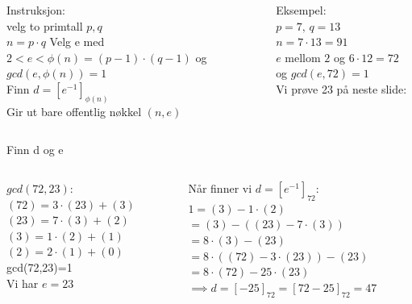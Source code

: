 \begin{frame}{}
    \begin{columns}
        \begin{column}{0.45 \textwidth}
            Instruksjon:\\
            velg to primtall $p,q$\\
            $n=p\cdot q$
            Velg e med $2<e<\phi(n)=(p-1)\cdot (q-1)$ og $gcd(e,\phi(n))=1$\\
            Finn $d=[e^{-1}]_{\phi(n)}$\\
            Gir ut bare offentlig nøkkel $(n,e)$
        \end{column}
        \begin{column}{0.45 \textwidth}
            Eksempel:\\
            $p=7,\,q=13$\\
            $n=7\cdot 13=91$\\
            $e$ mellom $2$ og $6\cdot 12=72$ og $gcd(e,72)=1$\\
            Vi prøve 23 på neste slide:
        \end{column}
    \end{columns}
\end{frame}

\begin{frame}{Finn d og e}
    \begin{columns}
        \begin{column}{0.45 \textwidth}
            $gcd(72,23):$\\
            $(72)=3\cdot (23)+(3)$\\
            $(23)=7\cdot(3)+(2)$\\
            $(3)=1\cdot (2)+(1)$\\
            $(2)=2\cdot (1)+(0)$\\
            gcd(72,23)=1\\
            Vi har $e=23$
        \end{column}
        \begin{column}{0.45 \textwidth}
            Når finner vi $d=[e^{-1}]_{72}$:\\
            $1=(3)-1\cdot (2)$\\
            $=(3)-((23)-7\cdot (3))$\\
            $=8\cdot (3)-(23)$\\
            $=8\cdot ((72)-3\cdot (23))-(23)$\\
            $=8\cdot (72)-25\cdot (23)$\\
            $\implies d=[-25]_{72}=[72-25]_{72}=47$
        \end{column}
    \end{columns}
\end{frame}

